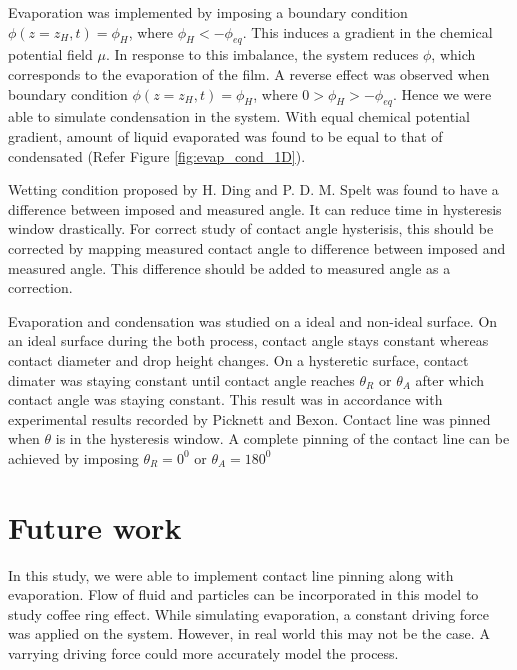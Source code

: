 \documentclass{article}
\begin{document}
\par
Evaporation was implemented by imposing a boundary condition $\phi(z=z_{H},t)=\phi_{H}$, where $\phi_{H} < -\phi_{eq}$. This induces a gradient in the chemical potential field $\mu$. In response to this imbalance, the system reduces $\phi$, which corresponds to the evaporation of the film\cite{paper:evaporation}. A reverse effect was observed when boundary condition $\phi(z=z_{H},t)=\phi_{H}$, where $0 > \phi_{H} > -\phi_{eq}$. Hence we were able to simulate condensation in the system. With equal chemical potential gradient, amount of liquid evaporated was found to be equal to that of condensated (Refer 
Figure \ref{fig:evap_cond_1D}).

\par
Wetting condition proposed by H. Ding and P. D. M. Spelt\cite{PhysRevE.75.046708} was found to have a difference between imposed and measured angle. It can reduce time in hysteresis window drastically. For correct study of contact angle hysterisis, this should be corrected by mapping measured contact angle to difference between imposed and measured angle. This difference should be added to measured angle as a correction.


\par
Evaporation and condensation was studied on a ideal and non-ideal surface. On an ideal surface during the both process, contact angle stays constant whereas contact diameter and drop height changes. On a hysteretic surface, contact dimater was staying constant until contact angle reaches $\theta_{R}$ or $\theta_{A}$ after which contact angle was staying constant. This result was in accordance with experimental results recorded by Picknett and Bexon\cite{PICKNETT1977336}. Contact line was pinned when $\theta$ is in the hysteresis window. A complete pinning of the contact line can be achieved by imposing $\theta_{R}=0^{0}$ or $\theta_{A}=180^{0}$

\section{Future work}
In this study, we were able to implement contact line pinning along with evaporation. Flow of fluid and particles can be incorporated in this model to study coffee ring effect. While simulating evaporation, a constant driving force was applied on the system. However, in real world this may not be the case. A varrying driving force could more accurately model the process.  

 

 
\end{document}
